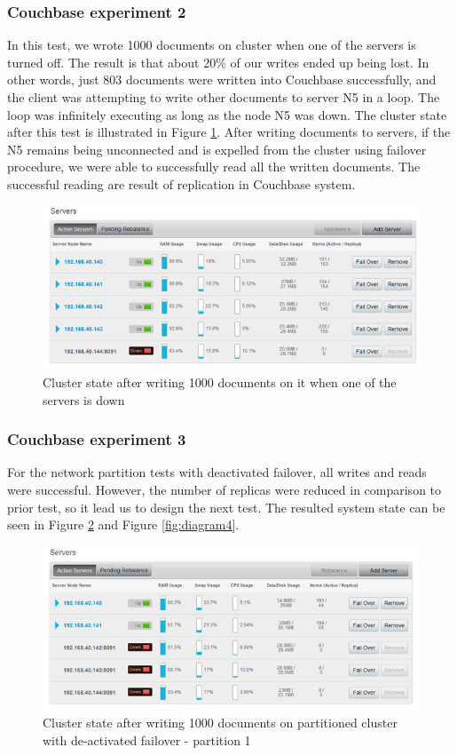 \documentclass[a4paper]{article}
\begin{document}
\subsubsection{Couchbase experiment 2}
In this test, we wrote 1000 documents on cluster when one of the servers is turned off.
The result is that about 20\% of our writes ended up being lost.
In other words, just 803 documents were written into Couchbase successfully, and the client was attempting to write other documents to server N5 in a loop.
The loop was infinitely executing as long as the node N5 was down.
The cluster state after this test is illustrated in Figure \ref{fig:diagram2}.
After writing documents to servers, if the N5 remains being unconnected and is expelled from the cluster using failover procedure, we were able to successfully read all the written documents.
The successful reading are result of replication in Couchbase system.

\begin{figure}[h!]
	\centering
	\includegraphics[width=\textwidth]{diagram2}
	\caption{Cluster state after writing 1000 documents on it when one of the servers is down}
	\label{fig:diagram2}
\end{figure}

\subsubsection{Couchbase experiment 3}
For the network partition tests with deactivated failover, all writes and reads were successful.  
However, the number of replicas were reduced in comparison to prior test, so it lead us to design the next test.
The resulted system state can be seen in Figure \ref{fig:diagram3} and Figure \ref{fig:diagram4}.

\begin{figure}[h!]
	\centering
	\includegraphics[width=\textwidth]{diagram3}
	\caption{Cluster state after writing 1000 documents on partitioned cluster with de-activated failover - partition 1}
	\label{fig:diagram3}
\end{figure}
\end{document}
